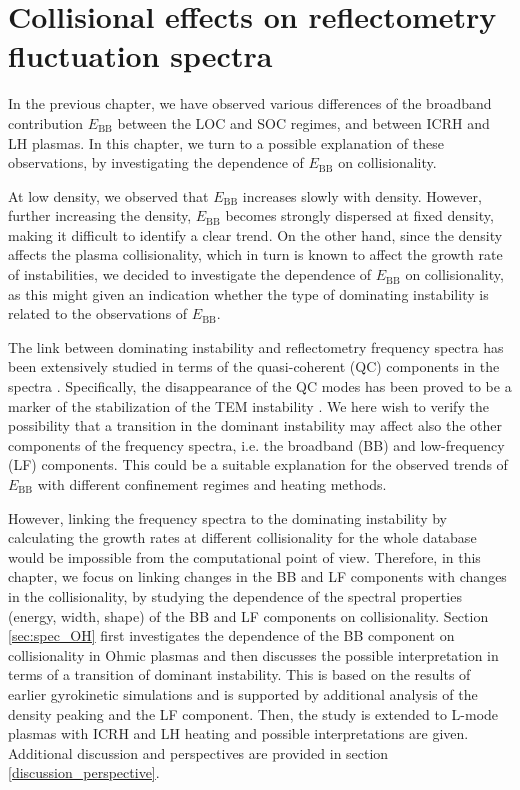 \chapter{Collisional effects on reflectometry fluctuation spectra} \label{ch:Spec_vs_nu}
\graphicspath{{chapter6_ys/}}
\minitoc

In the previous chapter, we have observed various differences of the broadband contribution $E_\mathrm{BB}$ between the LOC and SOC regimes, and between ICRH and LH plasmas. In this chapter, we turn to a possible explanation of these observations, by investigating the dependence of $E_\mathrm{BB}$ on collisionality.

At low density, we observed that $E_\mathrm{BB}$ increases slowly with density. However, further increasing the density, $E_\mathrm{BB}$ becomes strongly dispersed at fixed density, making it difficult to identify a clear trend. On the other hand, since the density affects the plasma collisionality, which in turn is known to affect the growth rate of instabilities, we decided to investigate the dependence of $E_\mathrm{BB}$ on collisionality, as this might given an indication whether the type of dominating instability is related to the observations of $E_\mathrm{BB}$.

The link between dominating instability and reflectometry frequency spectra has been extensively studied in terms of the quasi-coherent (QC) components in the spectra \cite{Arnichand_2014_NF}. Specifically, the disappearance of the QC modes has been proved to be a marker of the stabilization of the TEM instability \cite{Arnichand_2015_Thesis, Zhong_2016_PoP, Lee_2018_PoP}. We here wish to verify the possibility that a transition in the dominant instability may affect also the other components of the frequency spectra, i.e. the broadband (BB) and low-frequency (LF) components. This could be a suitable explanation for the observed trends of $E_\mathrm{BB}$ with different confinement regimes and heating methods.

However, linking the frequency spectra to the dominating instability by calculating the growth rates at different collisionality for the whole database would be impossible from the computational point of view. Therefore, in this chapter, we focus on linking changes in the BB and LF components with changes in the collisionality, by studying the dependence of the spectral properties (energy, width, shape) of the BB and LF components on collisionality. Section \ref{sec:spec_OH} first investigates the dependence of the BB component on collisionality in Ohmic plasmas and then discusses the possible interpretation in terms of a transition of dominant instability. This is based on the results of earlier gyrokinetic simulations and is supported by additional analysis of the density peaking and the LF component. Then, the study is extended to L-mode plasmas with ICRH and LH heating and possible interpretations are given. Additional discussion and perspectives are provided in section \ref{discussion_perspective}.


